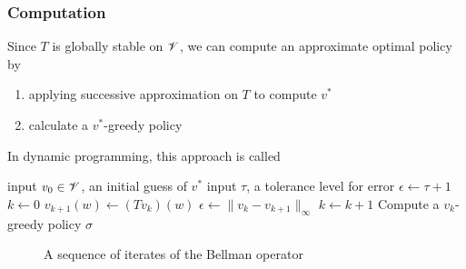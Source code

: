 \begin{frame}
    \frametitle{Computation}

    Since $T$ is globally stable on $\mathscr V$, we can compute an approximate
    optimal policy by 
    \begin{enumerate}
        \item applying successive approximation on $T$ to compute $v^*$
        \item calculate a $v^*$-greedy policy
    \end{enumerate}

    In dynamic programming, this approach is called 

\end{frame}



\begin{frame}

    {\small 
        \begin{algorithm}[H]
        \DontPrintSemicolon
        input $v_0 \in \mathscr V$, an initial guess of $v^*$ \;
        input $\tau$, a tolerance level for error \;
        $\epsilon \leftarrow \tau + 1$ \;
        $k \leftarrow 0$ \;
        \While{$\epsilon > \tau $}
        {
            {
                $v_{k+1}(w) \leftarrow (Tv_k) (w)$ \;
            }
            $\epsilon \leftarrow \| v_k - v_{k+1} \|_\infty$ \;
            $k \leftarrow k + 1$ \;
        }
        Compute a $v_k$-greedy policy $\sigma$ \;
        \Return{$\sigma$}
    \end{algorithm}
    }


\end{frame}


\begin{frame}
    
    \begin{figure}
        \centering
        \caption{\label{f:iid_job_search_1} A sequence of iterates of the Bellman operator}
    \end{figure}


\end{frame}


